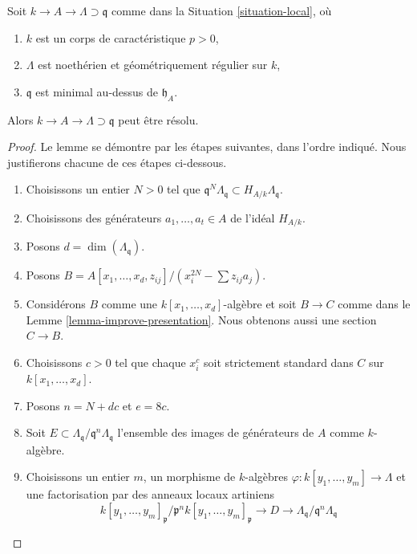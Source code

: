 \begin{lemma}
\label{lemma-resolve-general}
Soit $k \to A \to \Lambda \supset \mathfrak q$ comme dans la
Situation \ref{situation-local}, où
\begin{enumerate}
\item $k$ est un corps de caractéristique $p > 0$,
\item $\Lambda$ est noethérien et géométriquement régulier sur $k$,
\item $\mathfrak q$ est minimal au-dessus de $\mathfrak h_A$.
\end{enumerate}
Alors $k \to A \to \Lambda \supset \mathfrak q$ peut être résolu.
\end{lemma}

\begin{proof}
Le lemme se démontre par les étapes suivantes, dans l'ordre indiqué.
Nous justifierons chacune de ces étapes ci-dessous.
\begin{enumerate}
\item
\label{item-power}
Choisissons un entier $N > 0$ tel que
$\mathfrak q^N\Lambda_\mathfrak q \subset H_{A/k}\Lambda_\mathfrak q$.
\item
\label{item-generators}
Choisissons des générateurs $a_1, \ldots, a_t \in A$ de l'idéal $H_{A/k}$.
\item
\label{item-dimension}
Posons $d = \dim(\Lambda_\mathfrak q)$.
\item
\label{item-standardizer}
Posons $B = A[x_1, \ldots, x_d, z_{ij}]/(x_i^{2N} - \sum z_{ij}a_j)$.
\item
\label{item-elkik}
Considérons $B$ comme une $k[x_1, \ldots, x_d]$-algèbre et soit
$B \to C$ comme dans le
Lemme \ref{lemma-improve-presentation}.
Nous obtenons aussi une section $C \to B$.
\item
\label{item-strictly-standard}
Choisissons $c > 0$ tel que chaque $x_i^c$
soit strictement standard dans $C$ sur $k[x_1, \ldots, x_d]$.
\item
\label{item-set-n}
Posons $n = N + dc$ et $e = 8c$.
\item
\label{item-set-E}
Soit $E \subset \Lambda_\mathfrak q/\mathfrak q^n\Lambda_\mathfrak q$
l'ensemble des images de générateurs de $A$ comme $k$-algèbre.
\item
\label{item-NP}
Choisissons un entier $m$, un morphisme de $k$-algèbres
$\varphi : k[y_1, \ldots, y_m] \to \Lambda$
et une factorisation par des anneaux locaux artiniens
$$
k[y_1, \ldots, y_m]_\mathfrak p/\mathfrak p^n k[y_1, \ldots, y_m]_\mathfrak p
\to D \to
\Lambda_\mathfrak q/\mathfrak q^n\Lambda_\mathfrak q
$$
\end{enumerate}
\end{proof}

